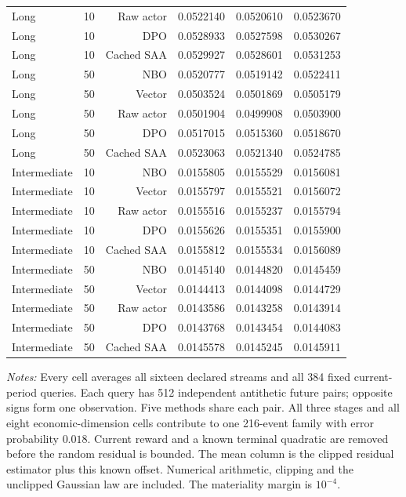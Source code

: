 \begin{longtable}{llrrrr}
Long & 10 & Raw actor & 0.0522140 & 0.0520610 & 0.0523670 \\
Long & 10 & DPO & 0.0528933 & 0.0527598 & 0.0530267 \\
Long & 10 & Cached SAA & 0.0529927 & 0.0528601 & 0.0531253 \\
Long & 50 & NBO & 0.0520777 & 0.0519142 & 0.0522411 \\
Long & 50 & Vector & 0.0503524 & 0.0501869 & 0.0505179 \\
Long & 50 & Raw actor & 0.0501904 & 0.0499908 & 0.0503900 \\
Long & 50 & DPO & 0.0517015 & 0.0515360 & 0.0518670 \\
Long & 50 & Cached SAA & 0.0523063 & 0.0521340 & 0.0524785 \\
Intermediate & 10 & NBO & 0.0155805 & 0.0155529 & 0.0156081 \\
Intermediate & 10 & Vector & 0.0155797 & 0.0155521 & 0.0156072 \\
Intermediate & 10 & Raw actor & 0.0155516 & 0.0155237 & 0.0155794 \\
Intermediate & 10 & DPO & 0.0155626 & 0.0155351 & 0.0155900 \\
Intermediate & 10 & Cached SAA & 0.0155812 & 0.0155534 & 0.0156089 \\
Intermediate & 50 & NBO & 0.0145140 & 0.0144820 & 0.0145459 \\
Intermediate & 50 & Vector & 0.0144413 & 0.0144098 & 0.0144729 \\
Intermediate & 50 & Raw actor & 0.0143586 & 0.0143258 & 0.0143914 \\
Intermediate & 50 & DPO & 0.0143768 & 0.0143454 & 0.0144083 \\
Intermediate & 50 & Cached SAA & 0.0145578 & 0.0145245 & 0.0145911 \\
\bottomrule
\end{longtable}
\begin{minipage}{0.97\linewidth}\footnotesize\emph{Notes:} Every cell averages all sixteen declared streams and all 384 fixed current-period queries. Each query has 512 independent antithetic future pairs; opposite signs form one observation. Five methods share each pair. All three stages and all eight economic-dimension cells contribute to one 216-event family with error probability $0.018$. Current reward and a known terminal quadratic are removed before the random residual is bounded. The mean column is the clipped residual estimator plus this known offset. Numerical arithmetic, clipping and the unclipped Gaussian law are included. The materiality margin is $10^{-4}$.
\end{minipage}

